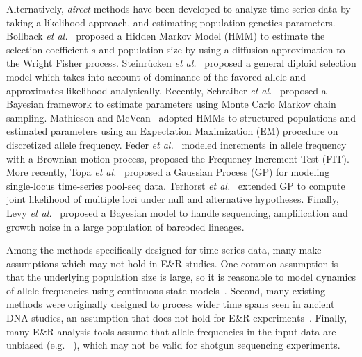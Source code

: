 Alternatively, \emph{direct} methods have been developed to analyze
time-series data by taking a likelihood approach, and estimating
population genetics parameters.  Bollback \emph{et
  al.}~\cite{bollback2008estimation} proposed a Hidden Markov Model
(HMM) to estimate the selection coefficient $s$ and population size by
using a diffusion approximation to the Wright Fisher 
process.  Steinr\"{u}cken \emph{et al.}~\cite{steinrucken2014novel}
proposed a general diploid selection model which takes into account of
dominance of the favored allele and approximates likelihood
analytically. Recently, Schraiber \emph{et
  al.}~\cite{schraiber2016bayesian} proposed a Bayesian framework to
estimate parameters using Monte Carlo Markov chain sampling. Mathieson
and McVean~\cite{mathieson2013estimating} adopted HMMs to structured
populations and estimated parameters using an Expectation Maximization
(EM) procedure on discretized allele frequency.  Feder \emph{et
  al.}~\cite{feder2014Identifying} modeled increments in allele
frequency with a Brownian motion process, proposed the Frequency
Increment Test (FIT). More recently, Topa \emph{et
  al.}~\cite{topa2015gaussian} proposed a Gaussian Process (GP) for
modeling single-locus time-series pool-seq data. Terhorst \emph{et
  al.}~\cite{Terhorst2015Multi} extended GP to compute joint
likelihood of multiple loci under null and alternative
hypotheses. Finally, Levy \emph{et al.}~\cite{levy2015quantitative} proposed a
Bayesian model to handle sequencing, amplification and growth noise in
a large population of barcoded lineages.



Among the methods specifically designed for time-series data, many
make assumptions which may not hold in E\&R studies. One common
assumption is that the underlying population size is large, so it is
reasonable to model dynamics of allele frequencies using continuous
state models~\cite{bollback2008estimation, feder2014Identifying,
  Terhorst2015Multi}. Second, many existing methods were originally
designed to process wider time spans seen in ancient DNA studies, an
assumption that does not hold for E\&R
experiments~\cite{steinrucken2014novel,
  schraiber2016bayesian}. Finally, many E\&R analysis tools assume
that allele frequencies in the input data are unbiased
(e.g. ~\cite{bollback2008estimation}), which may not be valid for
shotgun sequencing experiments.

